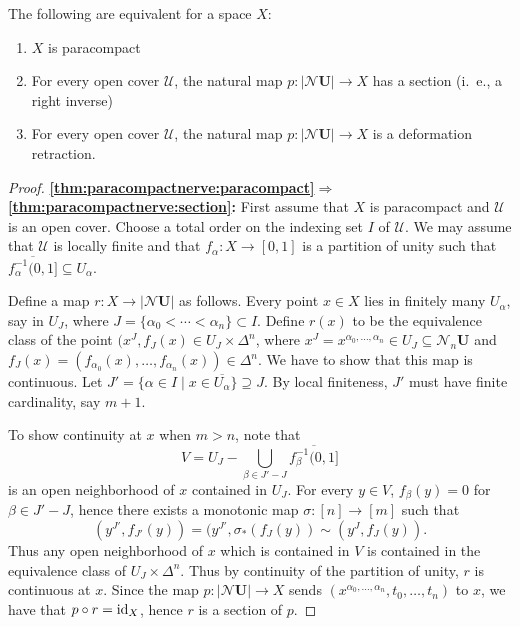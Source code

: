 \documentclass[a4paper,openany]{scrbook}
\newcommand{\nerve}{\mathcal N}
\begin{document}
\begin{thm}\label{thm:paracompactnerve}
The following are equivalent for a space $X$:
\begin{enumerate}
\item $X$ is paracompact\label{thm:paracompactnerve:paracompact}
\item For every open cover $\mathcal U$, the natural map $p\colon |\nerve \mathbf U| \to X$ has a section (i.~e., a right inverse)\label{thm:paracompactnerve:section}
\item For every open cover $\mathcal U$, the natural map $p\colon |\nerve \mathbf U| \to X$ is a deformation retraction.\label{thm:paracompactnerve:deformationretraction}
\end{enumerate}
\end{thm}
\begin{proof}
\noindent\textbf{\eqref{thm:paracompactnerve:paracompact}$\Longrightarrow$\eqref{thm:paracompactnerve:section}:}
First assume that $X$ is paracompact and $\mathcal U$ is an open cover. Choose a total order on the indexing set $I$ of $\mathcal U$. We may assume that $\mathcal U$ is locally finite and that $f_\alpha\colon X \to [0,1]$ is a partition of unity such that $\overline{f_\alpha^{-1}(0,1]} \subseteq U_\alpha$.

Define a map $r\colon X \to |\nerve\mathbf U|$ as follows. Every point $x \in X$ lies in finitely many $U_\alpha$, say in $U_J$, where $J=\{\alpha_0 < \cdots < \alpha_n\} \subset I$. Define $r(x)$ to be the equivalence class of the point $(x^J,f_J(x) \in U_J \times \Delta^n$, where $x^J = x^{\alpha_0,\dots,\alpha_n} \in U_J \subseteq \nerve_n\mathbf U$ and $f_J(x)=(f_{\alpha_0}(x),\dots,f_{\alpha_n}(x)) \in \Delta^n$. We have to show that this map is continuous. Let $J' = \{\alpha \in I \mid x \in \overline{U_\alpha}\} \supseteq J$. By local finiteness, $J'$ must have finite cardinality, say $m+1$. 

To show continuity at $x$ when $m>n$, note that
\[
V = U_J - \bigcup_{\beta \in J'-J} \overline{f_\beta^{-1}(0,1]}
\]
is an open neighborhood of $x$ contained in $U_J$. For every $y \in V$, $f_{\beta}(y) = 0$ for $\beta \in J'-J$, hence there exists a monotonic map $\sigma\colon [n] \to [m]$ such that
\[
(y^{J'},f_{J'}(y)) = (y^{J'},\sigma_*(f_J(y)) \sim (y^J,f_J(y)).
\]
Thus any open neighborhood of $x$ which is contained in $V$ is contained in the equivalence class of $U_J \times \Delta^n$. Thus by continuity of the partition of unity, $r$ is continuous at $x$. Since the map $p\colon |\nerve \mathbf U| \to X$ sends $(x^{\alpha_0,\dots,\alpha_n},t_0,\dots,t_n)$ to $x$, we have that $p \circ r = \operatorname{id}_X$, hence $r$ is a section of $p$.


\end{proof}
\end{document}
